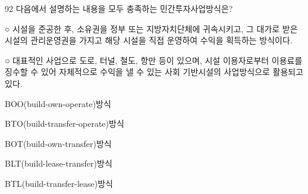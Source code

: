 \begin{question}{92}
다음에서 설명하는 내용을 모두 충족하는 민간투자사업방식은?
\begin{framedtext}
○ 시설을 준공한 후, 소유권을 정부 또는 지방자치단체에 귀속시키고, 그 대가로 받은 시설의 관리운영권을 가지고 해당 시설을 직접 운영하여 수익을 획득하는 방식이다. \par
○ 대표적인 사업으로 도로, 터널, 철도, 항만 등이 있으며, 시설 이용자로부터 이용료를 징수할 수 있어 자체적으로 수익을 낼 수 있는 사회 기반시설의 사업방식으로 활용되고 있다. \par
\end{framedtext}
\begin{choices}
  \item BOO(build-own-operate)방식
  \item BTO(build-transfer-operate)방식
  \item BOT(build-own-transfer)방식
  \item BLT(build-lease-transfer)방식
  \item BTL(build-transfer-lease)방식
\end{choices}
\end{question}
